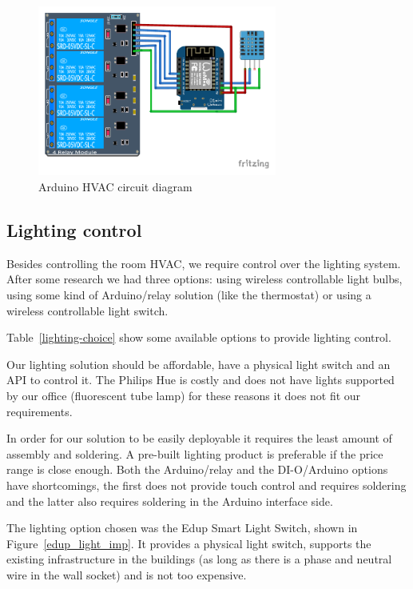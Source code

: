 \begin{figure}[htbp]
\centering
\includegraphics[width=0.7\textwidth]{Figures/arduino_imp}
\caption{Arduino HVAC circuit diagram}
\label{arduino_imp}
\end{figure}



\subsection{Lighting control}
Besides controlling the room \ac{HVAC}, we require control over the lighting system. After some research we had three options: using wireless controllable light bulbs, using some kind of Arduino/relay solution (like the thermostat) or using a wireless controllable light switch.

Table~\ref{lighting-choice} show some available options to provide lighting control.

Our lighting solution should be affordable, have a physical light switch and an API to control it. The Philips Hue is costly and does not have lights supported by our office (fluorescent tube lamp) for these reasons it does not fit our requirements.

In order for our solution to be easily deployable it requires the least amount of assembly and soldering. A pre-built lighting product is preferable if the price range is close enough. Both the Arduino/relay and the DI-O/Arduino options have shortcomings, the first does not provide touch control and requires soldering and the latter also requires soldering in the Arduino interface side.

The lighting option chosen was the Edup Smart Light Switch, shown in Figure~\ref{edup_light_imp}.  It provides a physical light switch, supports the existing infrastructure in the buildings (as long as there is a phase and neutral wire in the wall socket) and is not too expensive.


